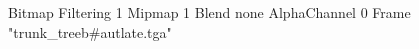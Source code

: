 {Bitmap
	{Filtering 1}
	{Mipmap 1}
	{Blend none}
	{AlphaChannel 0}
	{Frame "trunk_treeb#autlate.tga"}
}
